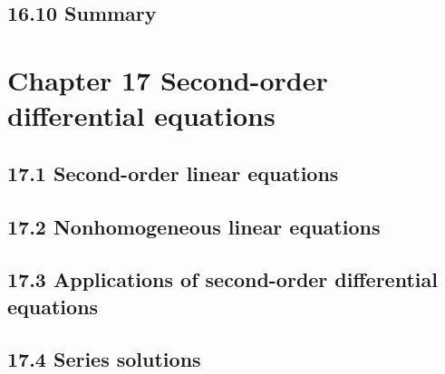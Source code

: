 \documentclass{article}
\begin{document}
\subsection{16.10 Summary}

\section{Chapter 17 Second-order differential equations}
\subsection{17.1 Second-order linear equations}
\subsection{17.2 Nonhomogeneous linear equations}
\subsection{17.3 Applications of second-order differential equations}
\subsection{17.4 Series solutions}
\end{document}
